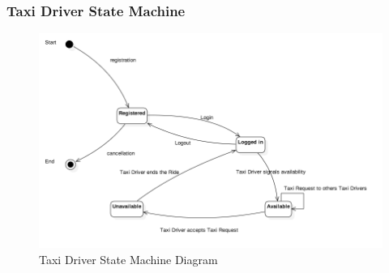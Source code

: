 \subsubsection{Taxi Driver State Machine}

	\begin{figure}[H]
		\centering
		\includegraphics[width=\textwidth, scale=0.5]{IMG/StateMachineDiagrams/TaxiDriver.png}
		\caption{Taxi Driver State Machine Diagram}\label{sec:FigureTaxiDriverStateMachine}
	\end{figure}